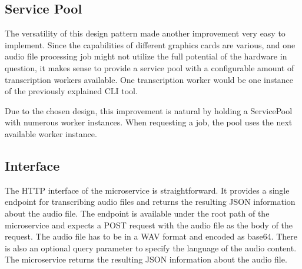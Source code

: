\subsection{Service Pool}

The versatility of this design pattern made another improvement very easy to implement. Since the capabilities of 
different graphics cards are various, and one audio file processing job might not utilize the full potential of the 
hardware in question, it makes sense to provide a service pool with a configurable amount of transcription workers 
available. One transcription worker would be one instance of the previously explained CLI tool.

Due to the chosen design, this improvement is natural by holding a ServicePool with numerous worker instances. When 
requesting a job, the pool uses the next available worker instance.

\subsection{Interface}

The HTTP interface of the microservice is straightforward. It provides a single endpoint for transcribing audio files 
and returns the resulting JSON information about the audio file. The endpoint is available under the root path of the 
microservice and expects a POST request with the audio file as the body of the request. The audio file has to be in a 
WAV format and encoded as base64. There is also an optional query parameter to specify the language of the audio 
content. The microservice returns the resulting JSON information about the audio file.

